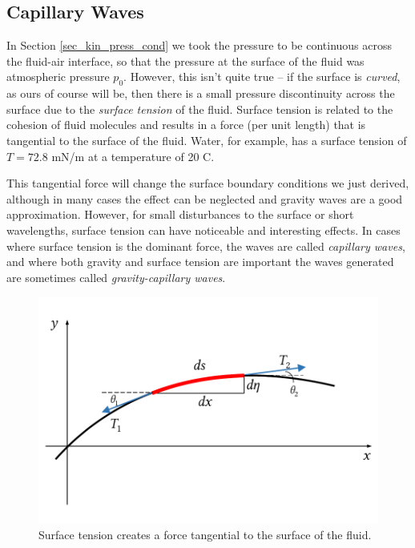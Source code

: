 

\subsection{Capillary Waves}

In Section \ref{sec_kin_press_cond} we took the pressure to be continuous across the fluid-air interface, so that the pressure at the surface of the fluid was atmospheric pressure $p_0$.  However, this isn't quite true -- if the surface is \emph{curved}, as ours of course will be, then there is a small pressure discontinuity across the surface due to the \emph{surface tension} of the fluid.  Surface tension is related to the cohesion of fluid molecules and results in a force (per unit length) that is tangential to the surface of the fluid.  Water, for example, has a surface tension of $T = 72.8$ mN/m at a temperature of 20 C.  

This tangential force will change the surface boundary conditions we just derived, although in many cases the effect can be neglected and gravity waves are a good approximation.  However, for small disturbances to the surface or short wavelengths, surface tension can have noticeable and interesting effects.  In cases where surface tension is the dominant force, the waves are called \emph{capillary waves}, and where both gravity and surface tension are important the waves generated are sometimes called \emph{gravity-capillary waves}.

\begin{figure}
\centering\includegraphics[width=0.8\linewidth]{Figures/Chapter5/fig_surface_tension}
\caption{Surface tension creates a force tangential to the surface of the fluid.}
\label{fig_surface_tension}
\end{figure}

